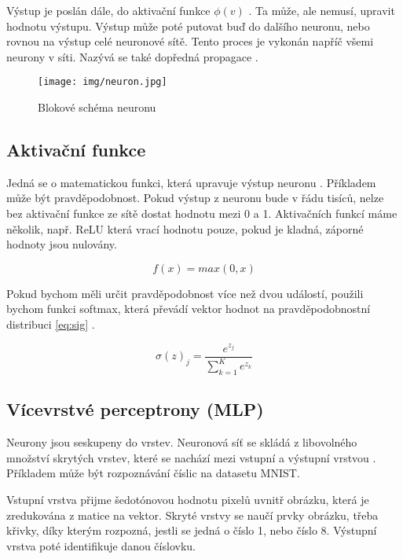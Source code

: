 \documentclass[FM,DP]{tulthesis}
\begin{document}
		Výstup je poslán dále, do aktivační funkce $\phi(v)$ . Ta může, ale nemusí, upravit hodnotu výstupu. Výstup může poté putovat buď do dalšího neuronu, nebo rovnou na výstup celé neuronové sítě. Tento proces je vykonán napříč všemi neurony v síti. Nazývá se také dopředná propagace \cite{general}.
		
		\begin{figure}[H]
			\centering
			\texttt{[image: img/neuron.jpg]}
			\caption{Blokové schéma neuronu \cite{dzone}}
			\label{fig:neuron}
		\end{figure}
		
		\subsection{Aktivační funkce}
		Jedná se o matematickou funkci, která upravuje výstup neuronu \cite{deepai_act}. Příkladem může být pravděpodobnost. Pokud výstup z neuronu bude v řádu tisíců, nelze bez aktivační funkce ze sítě dostat hodnotu mezi 0 a 1. Aktivačních funkcí máme několik, např. ReLU která vrací hodnotu pouze, pokud je kladná, záporné hodnoty jsou nulovány.

		\begin{equation}
			f(x) = max(0,x)
		\end{equation}
	
		Pokud bychom měli určit pravděpodobnost více než dvou událostí, použili bychom funkci softmax, která převádí vektor hodnot na pravděpodobnostní distribuci \ref{eq:sig} \cite{neuralnetwork101_act}.

		\begin{equation}
			\sigma(z)_j = \frac{e^{z_j}}{\sum_{k=1}^K e^{z_k}}
		\end{equation}

		\subsection{Vícevrstvé perceptrony (MLP)}
		Neurony jsou seskupeny do vrstev. Neuronová síť se skládá z libovolného množství skrytých vrstev, které se nachází mezi vstupní a výstupní vrstvou \cite{neuralnetwork101}. Příkladem může být rozpoznávání číslic na datasetu MNIST. 
		
		Vstupní vrstva přijme šedotónovou hodnotu pixelů uvnitř obrázku, která je zredukována z matice na vektor. Skryté vrstvy se naučí prvky obrázku, třeba křivky, díky kterým rozpozná, jestli se jedná o číslo 1, nebo číslo 8. Výstupní vrstva poté identifikuje danou číslovku. 
		
\end{document}
